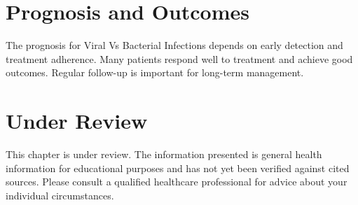 \section*{Prognosis and Outcomes}
The prognosis for Viral Vs Bacterial Infections depends on early detection and treatment adherence. Many patients respond well to treatment and achieve good outcomes. Regular follow-up is important for long-term management.
\section*{Under Review}
This chapter is under review. The information presented is general health information for educational purposes and has not yet been verified against cited sources. Please consult a qualified healthcare professional for advice about your individual circumstances.


\clearpage
